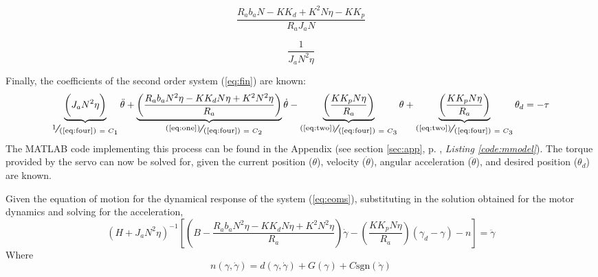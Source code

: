 \begin{minipage}[c]{.5\textwidth}
\begin{equation}
  \frac{R_ab_aN-KK_d+K^2N\eta-KK_p}{R_aJ_aN}
  \label{eq:three}
\end{equation}
\end{minipage}%
\begin{minipage}[c]{.5\textwidth}
\begin{equation}
  \frac{1}{J_aN^2\eta}
  \label{eq:four}
\end{equation}
\end{minipage}

Finally, the coefficients of the second order system (\ref{eq:fin}) are known:
\begin{equation}
  \underbrace{\bigg(J_aN^2\eta\bigg)}_{\scalebox{1.25}{\sfrac{1}{(\ref{eq:four})}\tiny$~=C_1$}}\ddot{\theta} + \underbrace{\left(\frac{R_ab_aN^2\eta - KK_dN\eta +
   K^2N^2\eta}{R_a}\right)}_{\quad\scalebox{1.25}{\sfrac{(\ref{eq:one})}{(\ref{eq:four})}\tiny$~=C_2$}}
  \dot{\theta} - \underbrace{\left(\frac{KK_pN\eta}{R_a}\right)}_{\scalebox{1.25}{\sfrac{(\ref{eq:two})}{(\ref{eq:four})}\tiny$~=C_3$}}
  \theta + \underbrace{\left(\frac{KK_pN\eta}{R_a}\right)}_{\scalebox{1.25}{\sfrac{(\ref{eq:two})}{(\ref{eq:four})}\tiny$~=C_3$}}
  \theta_d = -\tau
  \label{eq:fin}
\end{equation}
The MATLAB code implementing this process can be found in the Appendix (see section \ref{sec:app}, p. \pageref{sec:app}, \emph{Listing \ref{code:mmodel}}).
The torque provided by the servo can now be solved for, given the current position ($\theta$), velocity ($\dot{\theta}$), angular acceleration ($\ddot{\theta}$), and desired position ($\theta_d$) are known.

Given the equation of motion for the dynamical response of the system (\ref{eq:eoms}), substituting in the solution obtained for the motor dynamics and solving for the acceleration,
\[
\left(H + J_aN^2\eta\right)^{-1} \left[\left(B - \frac{R_ab_aN^2\eta - KK_dN\eta + K^2N^2\eta}{R_a}\right)\dot{\gamma} - \left(\frac{KK_pN\eta}{R_a}\right)(\gamma_d - \gamma) - n\right]= \ddot{\gamma}
\]
Where
\[
n(\gamma,\dot{\gamma}) = d(\gamma,\dot{\gamma}) + G(\gamma) + C\text{sgn}(\dot{\gamma})
\]
